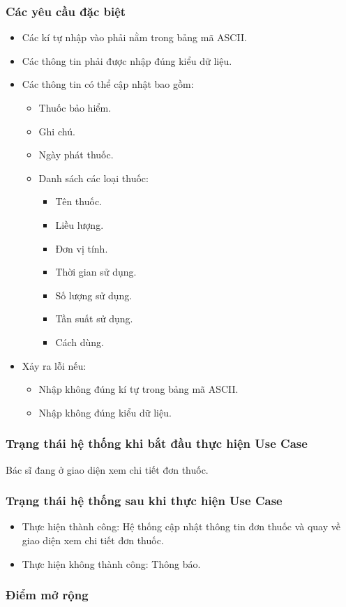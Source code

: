 \subsubsection{Các yêu cầu đặc biệt}
\begin{itemize}
  \item Các kí tự nhập vào phải nằm trong bảng mã ASCII.
  \item Các thông tin phải được nhập đúng kiểu dữ liệu.
  \item Các thông tin có thể cập nhật bao gồm:
    \begin{itemize}
      \item Thuốc bảo hiểm.
      \item Ghi chú.
      \item Ngày phát thuốc.
      \item Danh sách các loại thuốc:
      \begin{itemize}
        \item Tên thuốc.
        \item Liều lượng.
        \item Đơn vị tính.
        \item Thời gian sử dụng.
        \item Số lượng sử dụng.
        \item Tần suất sử dụng.
        \item Cách dùng.
      \end{itemize}
    \end{itemize}
  \item Xảy ra lỗi nếu:
    \begin{itemize}
      \item Nhập không đúng kí tự trong bảng mã ASCII.
      \item Nhập không đúng kiểu dữ liệu.
    \end{itemize}
\end{itemize}

\subsubsection{Trạng thái hệ thống khi bắt đầu thực hiện Use Case}
Bác sĩ đang ở giao diện xem chi tiết đơn thuốc.

\subsubsection{Trạng thái hệ thống sau khi thực hiện Use Case}
\begin{itemize}
  \item Thực hiện thành công: Hệ thống cập nhật thông tin đơn thuốc và quay về giao diện xem chi tiết đơn thuốc.
  \item Thực hiện không thành công: Thông báo.
\end{itemize}

\subsubsection{Điểm mở rộng}